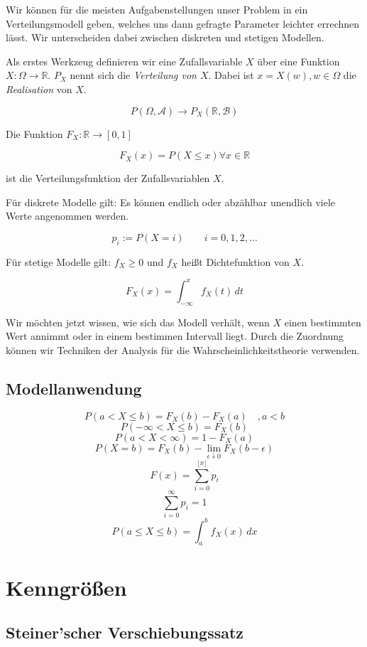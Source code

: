 \documentclass[a4paper,twocolumn]{article}
\begin{document}
Wir können für die meisten Aufgabenstellungen unser Problem in ein
Verteilungsmodell geben, welches uns dann gefragte Parameter leichter
errechnen lässt. Wir unterscheiden dabei zwischen diskreten und stetigen
Modellen.

Als erstes Werkzeug definieren wir eine Zufallsvariable $X$ über eine
Funktion $X: \Omega \rightarrow \mathbb{R}$. $P_X$ nennt sich die
\emph{Verteilung von $X$}.
Dabei ist $x = X(w), w \in \Omega$ die \emph{Realisation} von $X$.

\[
    P(\Omega, \mathcal{A})
        \rightarrow P_X(\mathbb{R}, \mathcal{B})
\]

Die Funktion $F_X:\mathbb{R} \rightarrow [0,1]$

\[
    F_X(x) = P(X \leq x) \forall x \in \mathbb{R}
\]

ist die Verteilungsfunktion der Zufallsvariablen $X$.

Für diskrete Modelle gilt: Es können endlich oder abzählbar unendlich viele
Werte angenommen werden.

\[
    p_i := P(X=i) \qquad i = 0,1,2,\ldots
\]

Für stetige Modelle gilt: $f_X \geq 0$ und $f_X$ heißt Dichtefunktion
von $X$.

\[
    F_X(x) = \int_{-\infty}^x f_X(t)\, dt
\]

Wir möchten jetzt wissen, wie sich das Modell verhält, wenn $X$ einen
bestimmten Wert annimmt oder in einem bestimmen Intervall liegt.
Durch die Zuordnung können wir Techniken der Analysis für die
Wahrscheinlichkeitstheorie verwenden.

\subsection{Modellanwendung}

\[
    P(a < X \leq b) = F_X(b) - F_X(a) \quad ,a < b
\] \[
    P(-\infty < X \leq b) = F_X(b)
\] \[
    P(a < X < \infty) = 1 - F_X(a)
\] \[
    P(X=b) = F_X(b) - \lim_{\epsilon\downarrow 0} F_X(b-\epsilon)
\] \[
    F(x) = \sum_{i=0}^{\lfloor x\rfloor} p_i
\] \[
    \sum_{i=0}^\infty p_i = 1
\] \[
    P(a \leq X \leq b) = \int_a^b f_X(x)\,dx
\]

\section{Kenngrößen}

\subsection{Steiner'scher Verschiebungssatz}
\end{document}

